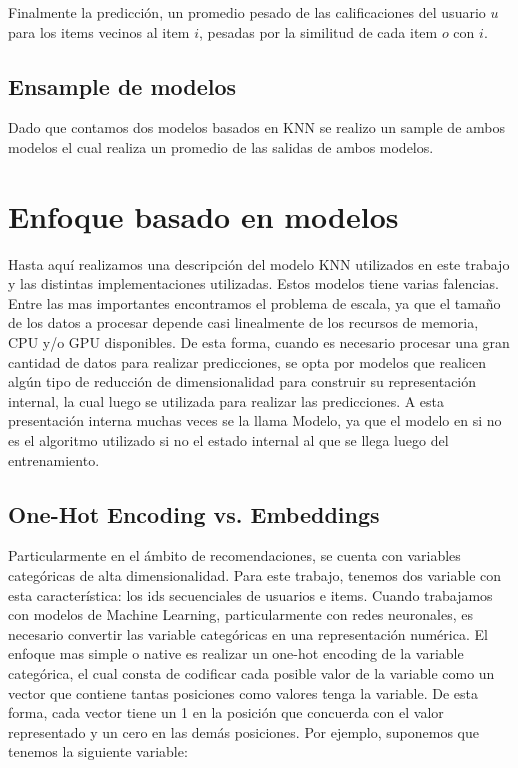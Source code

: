 \documentclass[11pt,a4paper,twoside]{thesis}
\begin{document}
Finalmente la predicción, un promedio pesado de las calificaciones del usuario $u$ para los items vecinos al item $i$, pesadas por la similitud de cada item $o$ con $i$.

\subsection{Ensample de modelos}

Dado que contamos dos modelos basados en KNN se realizo un sample de ambos modelos el cual realiza un promedio de las salidas de ambos modelos.

\section{Enfoque basado en modelos}

Hasta aquí realizamos una descripción del modelo KNN utilizados en este trabajo y las distintas implementaciones utilizadas. Estos modelos tiene varias falencias. Entre las mas importantes encontramos el problema de escala, ya que el tamaño de los datos a procesar depende casi linealmente de los recursos de memoria, CPU y/o GPU disponibles. De esta forma, cuando es necesario procesar una gran cantidad de datos para realizar predicciones, se opta por modelos que realicen algún tipo de reducción de dimensionalidad para construir su representación internal, la cual luego se utilizada para realizar las predicciones. A esta presentación interna muchas veces se la llama Modelo, ya que el modelo en si no es el algoritmo utilizado si no el estado internal al que se llega luego del entrenamiento. 

\subsection{One-Hot Encoding vs. Embeddings}

Particularmente en el ámbito de recomendaciones, se cuenta con variables categóricas de alta dimensionalidad. Para este trabajo, tenemos dos variable con esta característica: los ids secuenciales de usuarios e items. Cuando trabajamos con modelos de Machine Learning, particularmente con redes neuronales, es necesario convertir las variable categóricas en una representación numérica. El enfoque mas simple o native es realizar un one-hot encoding de la variable categórica, el cual consta de codificar cada posible valor de la variable como un vector que contiene tantas posiciones como valores tenga la variable. De esta forma, cada vector tiene un 1 en la posición que concuerda con el valor representado y un cero en las demás posiciones. Por ejemplo, suponemos que tenemos la siguiente variable:
\end{document}
